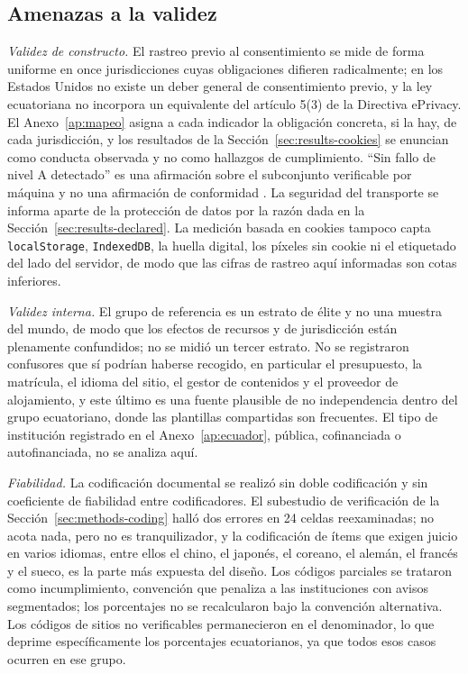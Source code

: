 \documentclass[pdflatex,sn-basic,Numbered]{sn-jnl}
\theoremstyle{thmstyleone}
\theoremstyle{thmstyletwo}
\theoremstyle{thmstylethree}
\begin{document}
\subsection{Amenazas a la validez}\label{sec:threats}

\emph{Validez de constructo.} El rastreo previo al consentimiento se mide de forma uniforme en once jurisdicciones cuyas obligaciones difieren radicalmente; en los Estados Unidos no existe un deber general de consentimiento previo, y la ley ecuatoriana no incorpora un equivalente del art\'iculo 5(3) de la Directiva ePrivacy. El Anexo~\ref{ap:mapeo} asigna a cada indicador la obligaci\'on concreta, si la hay, de cada jurisdicci\'on, y los resultados de la Secci\'on~\ref{sec:results-cookies} se enuncian como conducta observada y no como hallazgos de cumplimiento. ``Sin fallo de nivel A detectado'' es una afirmaci\'on sobre el subconjunto verificable por m\'aquina y no una afirmaci\'on de conformidad \citep{fischer2025coverage}. La seguridad del transporte se informa aparte de la protecci\'on de datos por la raz\'on dada en la Secci\'on~\ref{sec:results-declared}. La medici\'on basada en cookies tampoco capta \verb|localStorage|, \verb|IndexedDB|, la huella digital, los p\'ixeles sin cookie ni el etiquetado del lado del servidor, de modo que las cifras de rastreo aqu\'i informadas son cotas inferiores.

\emph{Validez interna.} El grupo de referencia es un estrato de \'elite y no una muestra del mundo, de modo que los efectos de recursos y de jurisdicci\'on est\'an plenamente confundidos; no se midi\'o un tercer estrato. No se registraron confusores que s\'i podr\'ian haberse recogido, en particular el presupuesto, la matr\'icula, el idioma del sitio, el gestor de contenidos y el proveedor de alojamiento, y este \'ultimo es una fuente plausible de no independencia dentro del grupo ecuatoriano, donde las plantillas compartidas son frecuentes. El tipo de instituci\'on registrado en el Anexo~\ref{ap:ecuador}, p\'ublica, cofinanciada o autofinanciada, no se analiza aqu\'i.

\emph{Fiabilidad.} La codificaci\'on documental se realiz\'o sin doble codificaci\'on y sin coeficiente de fiabilidad entre codificadores. El subestudio de verificaci\'on de la Secci\'on~\ref{sec:methods-coding} hall\'o dos errores en 24 celdas reexaminadas; no acota nada, pero no es tranquilizador, y la codificaci\'on de \'items que exigen juicio en varios idiomas, entre ellos el chino, el japon\'es, el coreano, el alem\'an, el franc\'es y el sueco, es la parte m\'as expuesta del dise\~no. Los c\'odigos parciales se trataron como incumplimiento, convenci\'on que penaliza a las instituciones con avisos segmentados; los porcentajes no se recalcularon bajo la convenci\'on alternativa. Los c\'odigos de sitios no verificables permanecieron en el denominador, lo que deprime espec\'ificamente los porcentajes ecuatorianos, ya que todos esos casos ocurren en ese grupo.
\end{document}
